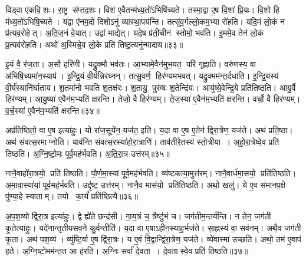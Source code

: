 विड्वा ए॑कवि॒शः।
रा॒ष्ट्र स॑प्तद॒शः।
विश॑ ए॒वैतन्म॑ध्य॒तो॑\-ऽभिषि॑च्यते।
तस्मा॒द्वा ए॒ष वि॒शां प्रि॒यः।
वि॒शो हि म॑ध्य॒तो॑ऽभिषि॒च्यते।
यद्वा ए॑नम॒दो दिशोऽनु॑ व्यास्था॒पय॑न्ति।
तत्सु॑व॒र्गल्लो॒कम॒भ्या रो॑हति।
यदि॒मं लो॒कं न प्र॑त्यव॒रोहेत्।
अ॒ति॒ज॒नं वे॒यात्।
उद्वा॑ माद्येत्।
यदे॒ष प्र॑ती॒चीन॑ स्तोमो॒ भव॑ति।
इ॒ममे॒व तेन॑ लो॒कं प्र॒त्यव॑रोहति।
अथो॑ अ॒स्मिन्ने॒व लो॒के प्रति॑ तिष्ठ॒त्यनु॑न्मादाय॥३३॥\anuvakamend[अक्र॑न्राज॒न्यो॑ भव॑न्ति दश॒पेयो॑ माद्ये॒त्रीणि॑ च]

इ॒यं वै॒ र॑ज॒ता।
अ॒सौ हरि॑णी।
यद्रु॒क्मौ भव॑तः।
आ॒भ्यामे॒वैन॑मुभ॒यत॒ परि॑ गृह्णाति।
वरु॑णस्य॒ वा अ॑भिषि॒च्यमा॑न॒स्याप॑।
इ॒न्द्रि॒यं वी॒र्य॑न्निर॑घ्नन्।
तत्सु॒वर्ण॒ हिर॑ण्यमभवत्।
यद्रु॒क्मम॑न्त॒र्दधा॑ति।
इ॒न्द्रि॒यस्य॑ वी॒र्य॑स्या\-नि॑र्घाताय।
श॒तमा॑नो भवति श॒तक्ष॑रः।
श॒तायु॒ पुरु॑षः श॒तेन्द्रि॑यः।
आयु॑ष्ये॒वेन्द्रि॒ये प्रति॑तिष्ठति।
आयु॒र्वै हिर॑ण्यम्।
आ॒यु॒ष्या॑ ए॒वैन॑म॒भ्यति॑ क्षरन्ति।
तेजो॒ वै हिर॑ण्यम्।
ते॒ज॒स्या॑ ए॒वैन॑म॒भ्यति॑ क्षरन्ति।
वर्चो॒ वै हिर॑ण्यम्।
व॒र्च॒स्या॑ ए॒वैन॑म॒भ्यति॑ क्षरन्ति॥३४॥\anuvakamend[श॒तक्ष॑रो॒ऽष्टौ च॑]

अप्र॑तिष्ठितो॒ वा ए॒ष इत्या॑हुः।
यो रा॑ज॒सूये॑न॒ यज॑त॒ इति॑।
य॒दा वा ए॒ष ए॒तेन॑ द्विरा॒त्रेण॒ यज॑ते।
अथ॑ प्रति॒ष्ठा।
अथ॑ संवत्स॒रमाप्नोति।
याव॑न्ति संवत्स॒रस्या॑होरा॒त्राणि॑।
ताव॑तीरे॒तस्य॑ स्तो॒त्रीया।
अ॒हो॒रा॒त्रेष्वे॒व प्रति॑ तिष्ठति।
अ॒ग्नि॒ष्टो॒मः पूर्व॒मह॑र्भवति।
अ॒ति॒रा॒त्र उत्त॑रम्॥३५॥

नानै॒वाहो॑रा॒त्रयो॒ प्रति॑ तिष्ठति।
पौ॒र्ण॒मा॒स्यां पूर्व॒मह॑र्भवति।
व्य॑ष्टकाया॒मुत्त॑रम्।
नानै॒वार्ध॑मा॒सयो॒ प्रति॑तिष्ठति।
अ॒मा॒वा॒स्या॑यां॒ पूर्व॒मह॑र्भवति।
उद्दृ॑ष्ट॒ उत्त॑रम्।
नानै॒व मास॑यो॒ प्रति॑तिष्ठति।
अथो॒ खलु॑।
ये ए॒व स॑मानप॒क्षे पु॑ण्या॒हे स्याताम्।
तयो का॒र्यं॑ प्रति॑ष्ठित्यै॥३६॥

अ॒प॒श॒व्यो द्वि॑रा॒त्र इत्या॑हुः।
द्वे ह्ये॑ते छन्द॑सी।
गा॒य॒त्रं च॒ त्रैष्टु॑भं च।
जग॑तीम॒न्तर्य॑न्ति।
न तेन॒ जग॑ती कृ॒तेत्या॑हुः।
यदे॑नान्तृतीयसव॒ने कु॒र्वन्तीति॑।
य॒दा वा ए॒षाऽहीन॒स्याह॒र्भज॑ते।
सा॒ह्नस्य॑ वा॒ सव॑नम्।
अथै॒व जग॑ती कृ॒ता।
अथ॑ पश॒व्य॑।
व्यु॑ष्टि॒र्वा ए॒ष द्वि॑रा॒त्रः।
य ए॒वं वि॒द्वान्द्वि॑रा॒त्रेण॒ यज॑ते।
व्ये॑वास्मा॑ उच्छति।
अथो॒ तम॑ ए॒वाप॑ हते।
अ॒ग्नि॒ष्टो॒मम॑न्त॒त आ ह॑रति।
अ॒ग्निः सर्वा॑ दे॒वता।
दे॒वतास्वे॒व प्रति॑ तिष्ठति॥३७॥\anuvakamend[उत्त॑रं॒ प्रति॑ष्ठित्यै पश॒व्य॑ स॒प्त च॑]

\clearpage


